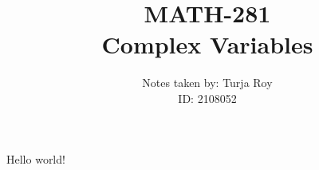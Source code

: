 \documentclass[12pt]{article}
\title{
    \textbf{MATH-281} \\
    \textbf{Complex Variables}
}
\author{
    Notes taken by: Turja Roy \\
    ID: 2108052
}
\date{}
\begin{document}
\maketitle

Hello world!
\end{document}
